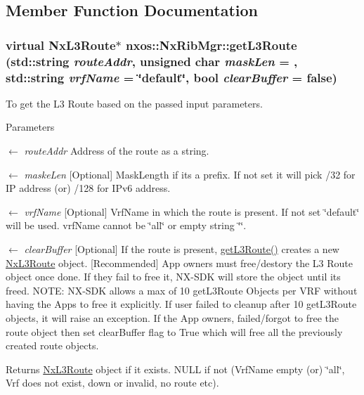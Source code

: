 \subsection{Member Function Documentation}
\hypertarget{classnxos_1_1NxRibMgr_ae84cf1b9546fc3bf70e12bc7209ca190}{
\subsubsection[{getL3Route}]{\setlength{\rightskip}{0pt plus 5cm}virtual {\bf NxL3Route}$\ast$ nxos::NxRibMgr::getL3Route (std::string {\em routeAddr}, \/  unsigned char {\em maskLen} = {}, \/  std::string {\em vrfName} = {\ttfamily \char`\"{}default\char`\"{}}, \/  bool {\em clearBuffer} = {\ttfamily false})}}
\label{classnxos_1_1NxRibMgr_ae84cf1b9546fc3bf70e12bc7209ca190}
To get the L3 Route based on the passed input parameters. 
\begin{DoxyParams}{Parameters}
\item[\mbox{$\leftarrow$} {\em routeAddr}]Address of the route as a string. \item[\mbox{$\leftarrow$} {\em maskeLen}]\mbox{[}Optional\mbox{]} MaskLength if its a prefix. If not set it will pick /32 for IP address (or) /128 for IPv6 address. \item[\mbox{$\leftarrow$} {\em vrfName}]\mbox{[}Optional\mbox{]} VrfName in which the route is present. If not set \char`\"{}default\char`\"{} will be used. vrfName cannot be \char`\"{}all\char`\"{} or empty string \char`\"{}\char`\"{}. \item[\mbox{$\leftarrow$} {\em clearBuffer}]\mbox{[}Optional\mbox{]} If the route is present, \hyperlink{classnxos_1_1NxRibMgr_ae84cf1b9546fc3bf70e12bc7209ca190}{getL3Route()} creates a new \hyperlink{classnxos_1_1NxL3Route}{NxL3Route} object. \mbox{[}Recommended\mbox{]} App owners must free/destory the L3 Route object once done. If they fail to free it, NX-\/SDK will store the object until its freed. NOTE: NX-\/SDK allows a max of 10 getL3Route Objects per VRF without having the Apps to free it explicitly. If user failed to cleanup after 10 getL3Route objects, it will raise an exception. If the App owners, failed/forgot to free the route object then set clearBuffer flag to True which will free all the previously created route objects. \end{DoxyParams}
\begin{DoxyReturn}{Returns}
\hyperlink{classnxos_1_1NxL3Route}{NxL3Route} object if it exists. NULL if not (VrfName empty (or) \char`\"{}all\char`\"{}, Vrf does not exist, down or invalid, no route etc).
\end{DoxyReturn}


